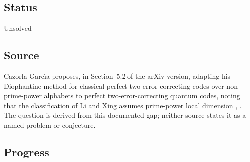 \subsection*{Status}

Unsolved

\subsection*{Source}

Cazorla Garc\'{\i}a proposes, in Section~5.2 of the arXiv version, adapting his
Diophantine method for classical perfect two-error-correcting codes over
non-prime-power alphabets to perfect two-error-correcting quantum codes, noting
that the classification of Li and Xing assumes prime-power local dimension
,
.  The question is derived from this
documented gap; neither source states it as a named problem or conjecture.

\subsection*{Progress}

